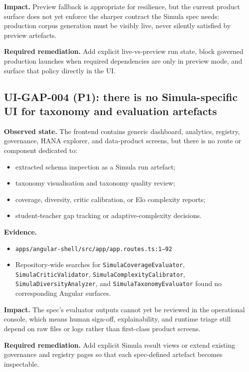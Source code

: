 \textbf{Impact.}
Preview fallback is appropriate for resilience, but the current
product surface does not yet enforce the sharper contract the Simula
spec needs: production corpus generation must be visibly live, never
silently satisfied by preview artefacts.

\textbf{Required remediation.}
Add explicit live-vs-preview run state, block governed production
launches when required dependencies are only in preview mode, and
surface that policy directly in the UI.

\subsection*{UI-GAP-004 (P1): there is no Simula-specific UI for taxonomy and evaluation artefacts}
\textbf{Observed state.}
The frontend contains generic dashboard, analytics, registry,
governance, HANA explorer, and data-product screens, but there is no
route or component dedicated to:
\begin{itemize}
  \item extracted schema inspection as a Simula run artefact;
  \item taxonomy visualisation and taxonomy quality review;
  \item coverage, diversity, critic calibration, or Elo complexity
    reports;
  \item student-teacher gap tracking or adaptive-complexity
    decisions.
\end{itemize}

\textbf{Evidence.}
\begin{itemize}
  \item \texttt{apps/angular-shell/src/app/app.routes.ts:1--92}
  \item Repository-wide searches for
    \texttt{SimulaCoverageEvaluator},
    \texttt{SimulaCriticValidator},
    \texttt{SimulaComplexityCalibrator},
    \texttt{SimulaDiversityAnalyzer}, and
    \texttt{SimulaTaxonomyEvaluator} found no corresponding Angular
    surfaces.
\end{itemize}

\textbf{Impact.}
The spec's evaluator outputs cannot yet be reviewed in the operational
console, which means human sign-off, explainability, and runtime
triage still depend on raw files or logs rather than first-class
product screens.

\textbf{Required remediation.}
Add explicit Simula result views or extend existing governance and
registry pages so that each spec-defined artefact becomes inspectable.


